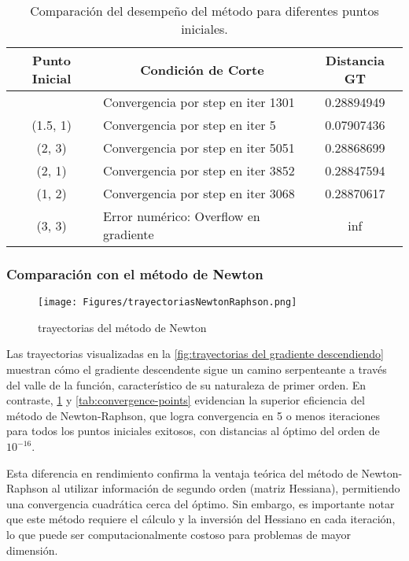 \documentclass{tp02}
\begin{document}
    \begin{table}[h]
        \centering
        \begin{tabular}{|c|l|c|}
        \hline
        Punto Inicial & \multicolumn{1}{c|}{Condición de Corte} & Distancia GT \\
        \hline
        [1, 1.5] & Convergencia por step en iter 1301 & 0.28894949 \\
        (1.5, 1) & Convergencia por step en iter 5  & 0.07907436 \\
        (2, 3)   & Convergencia por step en iter 5051 & 0.28868699 \\
        (2, 1)   & Convergencia por step en iter 3852 & 0.28847594 \\
        (1, 2)   & Convergencia por step en iter 3068 & 0.28870617 \\
        (3, 3)   & Error numérico: Overflow en gradiente & inf \\
        \hline
        \end{tabular}
        \caption{Comparación del desempeño del método para diferentes puntos iniciales.}
        \label{tab:initial-points}
        \end{table}


\subsubsection{Comparación con el método de Newton}


    \begin{figure}[H]
        \centering
        \texttt{[image: Figures/trayectoriasNewtonRaphson.png]}
        \caption{trayectorias del método de Newton}
        \label{fig:trayectorias del método de Newton}
        \end{figure}

Las trayectorias visualizadas en la \ref{fig:trayectorias del gradiente descendiendo}
muestran cómo el gradiente 
descendente sigue un camino serpenteante a través del valle de la función,
característico de su naturaleza de primer orden. En contraste, \ref{fig:trayectorias del método de Newton} 
y \ref{tab:convergence-points} evidencian la superior eficiencia del método de Newton-Raphson, que
logra convergencia en 5 o menos iteraciones para todos los puntos iniciales
exitosos, con distancias al óptimo del orden de $10^{-16}$.

Esta diferencia en rendimiento confirma la ventaja teórica del método de 
Newton-Raphson al utilizar información de segundo orden (matriz Hessiana), 
permitiendo una convergencia cuadrática cerca del óptimo. Sin embargo, es
importante notar que este método requiere el cálculo y la inversión del 
Hessiano en cada iteración, lo que puede ser computacionalmente costoso para
problemas de mayor dimensión.
\end{document}
